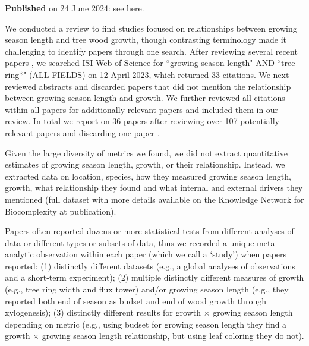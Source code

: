 \documentclass[11pt]{article}
\begin{document}
{\bf Published} on 24 June 2024: \href{https://knb.ecoinformatics.org/view/urn%3Auuid%3A8ade2a32-fd5f-467f-8d6e-231ca72876aa}{see here}.

We conducted a review to find studies focused on relationships between growing season length and tree wood growth, though contrasting terminology made it challenging to identify papers through one search. After reviewing several recent papers \citep{dow2022warm,zohner2023effect}, we searched ISI Web of Science for ``growing season length" AND ``tree ring*" (ALL FIELDS) on 12 April 2023, which returned 33 citations. We next reviewed abstracts and discarded papers that did not mention the relationship between growing season length and growth. We further reviewed all citations within all papers for additionally relevant papers and included them in our review. In total we report on 36 papers after reviewing over 107 potentially relevant papers and discarding one paper \citep[][which used tree lines as a metric of both growth and growing season length]{bruening2017}. 

Given the large diversity of metrics we found, we did not extract quantitative estimates of growing season length, growth, or their relationship. Instead, we extracted data on location, species, how they measured growing season length, growth, what relationship they found and what internal and external drivers they mentioned (full dataset with more details available on the Knowledge Network for Biocomplexity at publication).

Papers often reported dozens or more statistical tests from different analyses of data or different types or subsets of data, thus we recorded a unique meta-analytic observation within each paper (which we call a `study') when papers reported: (1) distinctly different datasets (e.g., a global analyses of observations and a short-term experiment); (2) multiple distinctly different measures of growth (e.g., tree ring width and flux tower) and/or growing season length (e.g., they reported both end of season as budset and end of wood growth through xylogenesis); (3) distinctly different results for growth $\times$  growing season length depending on metric (e.g., using budset for growing season length they find a growth $\times$ growing season length relationship, but using leaf coloring they do not). 
\end{document}

